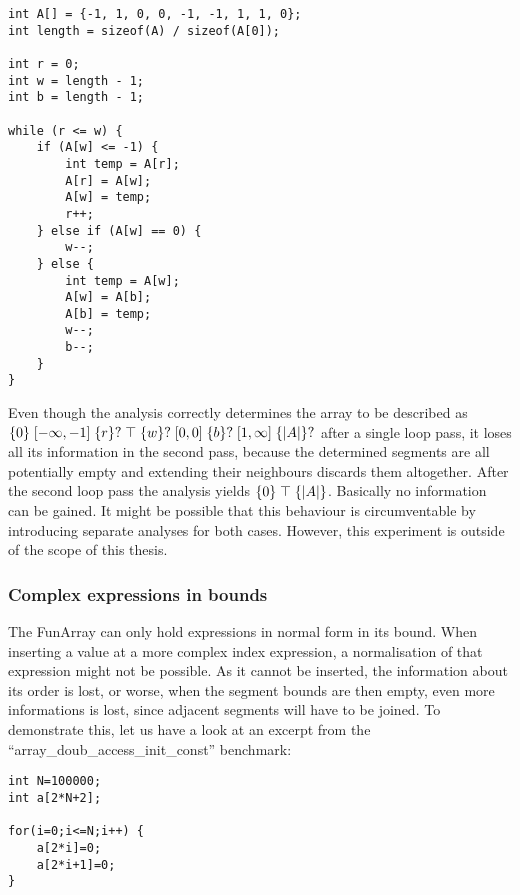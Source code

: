 \vspace{2mm}
\begin{center}
\begin{BVerbatim}
int A[] = {-1, 1, 0, 0, -1, -1, 1, 1, 0};
int length = sizeof(A) / sizeof(A[0]);

int r = 0;
int w = length - 1;
int b = length - 1;

while (r <= w) {
    if (A[w] <= -1) {
        int temp = A[r];
        A[r] = A[w];
        A[w] = temp;
        r++;
    } else if (A[w] == 0) {
        w--;
    } else {
        int temp = A[w];
        A[w] = A[b];
        A[b] = temp;
        w--;
        b--;
    }
}
\end{BVerbatim}
\end{center}
 
\noindent Even though the analysis correctly determines the array to be described as $\{0\} \;[-\infty, -1]\; \{r\}? \;\top\; \{w\}? \;[0, 0]\; \{b\}? \;[1, \infty]\;  \{|A|\}?$ after a single loop pass, it loses all its information in the second pass, because the determined segments are all potentially empty and extending their neighbours discards them altogether. After the second loop pass the analysis yields $\{0\} \;\top\; \{|A|\}$. Basically no information can be gained. It might be possible that this behaviour is circumventable by introducing separate analyses for both cases. However, this experiment is outside of the scope of this thesis.
 
\subsubsection{Complex expressions in bounds}

The FunArray can only hold expressions in normal form in its bound. When inserting a value at a more complex index expression, a normalisation of that expression might not be possible. As it cannot be inserted, the information about its order is lost, or worse, when the segment bounds are then empty, even more informations is lost, since adjacent segments will have to be joined. To demonstrate this, let us have a look at an excerpt from the ``array\_doub\_access\_init\_\allowbreak{}const'' benchmark:


\begin{adjustbox}{center}
\begin{lstlisting}
int N=100000;
int a[2*N+2];

for(i=0;i<=N;i++) {
    a[2*i]=0;
    a[2*i+1]=0;
}
\end{lstlisting}
\end{adjustbox}
\vspace{2mm}

